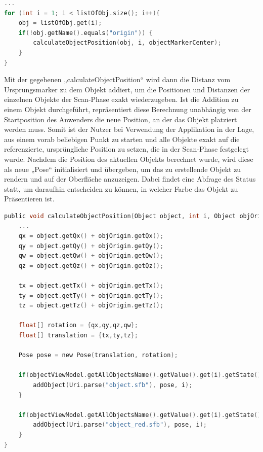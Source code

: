 \linebreak
\begin{lstlisting}[language=C,
    frame=lines,           % Ein Rahmen um den Code (single for box, lines for top and bottom)
    xleftmargin=\parindent,  % Rahmen link von den Zahlen
    style=algoBericht,
    label={code:listOfObjects},
    captionpos=b,           % Caption unter den Code setzen
caption={Abfolge der Objekte in der Liste}]
... 
for (int i = 1; i < listOfObj.size(); i++){
    obj = listOfObj.get(i);
    if(!obj.getName().equals("origin")) {
        calculateObjectPosition(obj, i, objectMarkerCenter);
    }
}
\end{lstlisting}
Mit der gegebenen „calculateObjectPosition“ wird dann die Distanz vom Ursprungsmarker zu dem Objekt addiert, um 
die Positionen und Distanzen der einzelnen Objekte der Scan-Phase exakt wiederzugeben. Ist die Addition zu einem Objekt durchgeführt, repräsentiert diese 
Berechnung unabhängig von der Startposition des Anwenders die neue Position, an der das Objekt platziert werden muss. Somit ist der Nutzer bei Verwendung der 
Applikation in der Lage, aus einem vorab beliebigen Punkt zu starten und alle Objekte exakt auf die referenzierte, ursprüngliche Position zu setzen, die 
in der Scan-Phase festgelegt wurde. Nachdem die Position des aktuellen Objekts berechnet wurde, wird diese als neue „Pose“ initialisiert und übergeben, um 
das zu erstellende Objekt zu rendern und auf der Oberfläche anzuzeigen. Dabei findet eine Abfrage des Status statt, um daraufhin 
entscheiden zu können, in welcher Farbe das Objekt zu Präsentieren ist.  
\\ 
\begin{lstlisting}[language=C,
    frame=lines,           % Ein Rahmen um den Code (single for box, lines for top and bottom)
    xleftmargin=\parindent,  % Rahmen link von den Zahlen
    style=algoBericht,
    label={code:additionOfObject},
    captionpos=b,           % Caption unter den Code setzen
caption={Berechnung der Markerplatzierung}]
public void calculateObjectPosition(Object object, int i, Object objOrigin){
    ... 
    qx = object.getQx() + objOrigin.getQx();
    qy = object.getQy() + objOrigin.getQy();
    qw = object.getQw() + objOrigin.getQw();
    qz = object.getQz() + objOrigin.getQz();

    tx = object.getTx() + objOrigin.getTx();
    ty = object.getTy() + objOrigin.getTy();
    tz = object.getTz() + objOrigin.getTz();

    float[] rotation = {qx,qy,qz,qw};
    float[] translation = {tx,ty,tz};

    Pose pose = new Pose(translation, rotation);

    if(objectViewModel.getAllObjectsName().getValue().get(i).getState() == 1) {
        addObject(Uri.parse("object.sfb"), pose, i);
    }

    if(objectViewModel.getAllObjectsName().getValue().get(i).getState() == -1){
        addObject(Uri.parse("object_red.sfb"), pose, i);
    }
}
\end{lstlisting}

